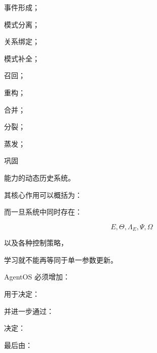 事件形成；

模式分离；

关系绑定；

模式补全；

召回；

重构；

合并；

分裂；

蒸发；

巩固

能力的动态历史系统。

其核心作用可以概括为：

\begin{statementbox}
\centering
{}
\end{statementbox}

而一旦系统中同时存在：

\[
E,
\Theta,
\Lambda_E,
\Psi,
\Omega
\]

以及各种控制策略，

学习就不能再等同于单一参数更新。

AgentOS 必须增加：

\begin{statementbox}
\centering
{}
\end{statementbox}

用于决定：

\begin{statementbox}
\centering
{}
\end{statementbox}

并进一步通过：

\begin{statementbox}
\centering
{}
\end{statementbox}

决定：

\begin{statementbox}
\centering
{}
\end{statementbox}

最后由：

\begin{statementbox}
\centering
{}
\end{statementbox}

